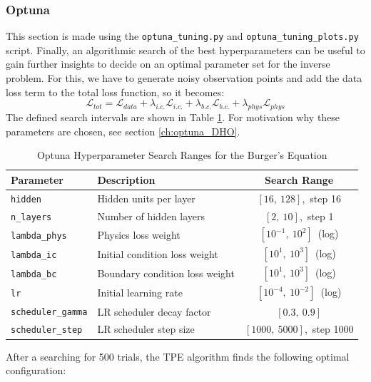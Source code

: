 \documentclass[we,twoside,openright,a4paper,11pt]{uantwerpenbamathesis}
\begin{document}
\subsubsection{Optuna}
This section is made using the \verb|optuna_tuning.py| and \verb|optuna_tuning_plots.py| script. Finally, an algorithmic search of the best hyperparameters can be useful to gain further insights to decide on an optimal parameter set for the inverse problem. For this, we have to generate noisy observation points and add the data loss term to the total loss function, so it becomes:
\begin{equation}\label{eq:loss_BE}
    \mathcal{L}_{tot} = \mathcal{L}_{data}+\lambda_{i.c.}\mathcal{L}_{i.c.} + \lambda_{b.c.}\mathcal{L}_{b.c.} + \lambda_{phys}\mathcal{L}_{phys}
\end{equation}
The defined search intervals are shown in Table \ref{tab:optuna_hyperparams_BE}. For motivation why these parameters are chosen, see section \ref{ch:optuna_DHO}.
\begin{table}[H]
\centering
\caption{Optuna Hyperparameter Search Ranges for the Burger's Equation}\label{tab:optuna_hyperparams_BE}
\begin{tabular}{llc}
\toprule
\textbf{Parameter} & \textbf{Description} & \textbf{Search Range} \\
\midrule
\texttt{hidden}           & Hidden units per layer         & $[16,\ 128]$,\ step 16 \\
\texttt{n\_layers}        & Number of hidden layers        & $[2,\ 10]$,\ step 1 \\
\texttt{lambda\_phys}     & Physics loss weight            & $[10^{-1},\ 10^{2}]$\ (log) \\
\texttt{lambda\_ic}       & Initial condition loss weight  & $[10^{1},\ 10^{3}]$\ (log) \\
\texttt{lambda\_bc}       & Boundary condition loss weight & $[10^{1},\ 10^{3}]$\ (log) \\
\texttt{lr}               & Initial learning rate          & $[10^{-4},\ 10^{-2}]$\ (log) \\
\texttt{scheduler\_gamma} & LR scheduler decay factor      & $[0.3,\ 0.9]$ \\
\texttt{scheduler\_step}  & LR scheduler step size         & $[1000,\ 5000]$,\ step 1000 \\
\bottomrule
\end{tabular}
\end{table}
After a searching for 500 trials, the TPE algorithm finds the following optimal configuration:
\end{document}
